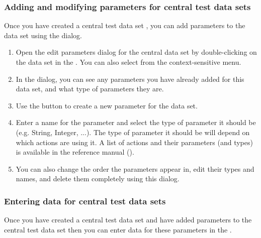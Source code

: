\subsubsection{Adding and modifying parameters for central test data sets}
\label{TasksCentralDataEditParams}

Once you have created a central test data set , you can add parameters to the data set using the  dialog. 
\begin{enumerate}
\item Open the edit parameters dialog for the central data set by double-clicking on the data set in the \gddataeditor{}. You can also select  from the context-sensitive menu. 
\item In the  dialog, you can see any parameters you have already added for this data set, and what type of parameters they are. 
\item Use the  button to create a new parameter for the data set. 
\item Enter a name for the parameter and select the type of parameter it should be (e.g. String, Integer, ...). The type of parameter it should be will depend on which actions are using it. A list of actions and their parameters (and types) is available in the reference manual ().

\item You can also change the order the parameters appear in, edit their types and names, and delete them completely using this dialog. 

\end{enumerate}


\subsubsection{Entering data for central test data sets}
\label{TasksDSVCentral}

Once you have created a central test data set  and have added parameters to the central test data set  then you can enter data for these parameters in the \gddatasetsview{}.

